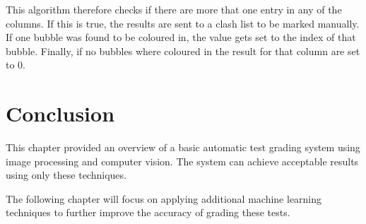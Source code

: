 This algorithm therefore checks if there are more that one entry in any of the columns. If this is true, the results are sent to a clash list to be marked manually. If one bubble was found to be coloured in, the value gets set to the index of that bubble. Finally, if no bubbles where coloured in the result for that column are set to 0.

\section{Conclusion}

This chapter provided an overview of a basic automatic test grading system using image processing and computer vision. The system can achieve acceptable results using only these techniques.

The following chapter will focus on applying additional machine learning techniques to further improve the accuracy of grading these tests.